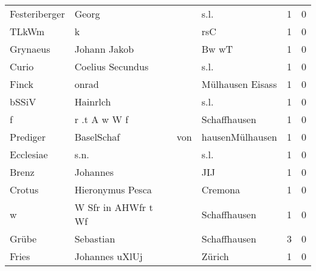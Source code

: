 \begin{center}
\begin{tiny}
\begin{longtabu}{llllrr}
            Festeriberger &                              Georg &             &                                        s.l. &          1 &         0 \\
                    TLkWm &                                  k &             &                                         rsC &          1 &         0 \\
                 Grynaeus &                       Johann Jakob &             &                                       Bw wT &          1 &         0 \\
                    Curio &                   Coelius Secundus &             &                                        s.l. &          1 &         0 \\
                    Finck &                              onrad &             &                            Mülhausen Eisass &          1 &         0 \\
                    bSSiV &                           Hainrlch &             &                                        s.l. &          1 &         0 \\
                        f &                       r .t A w W f &             &                                Schaffhausen &          1 &         0 \\
                 Prediger &                         BaselSchaf &         von &                             hausenMülhausen &          1 &         0 \\
                Ecclesiae &                               s.n. &             &                                        s.l. &          1 &         0 \\
                    Brenz &                           Johannes &             &                                         JIJ &          1 &         0 \\
                   Crotus &                   Hieronymus Pesca &             &                                     Cremona &          1 &         0 \\
                        w &                W Sfr in AHWfr t Wf &             &                                Schaffhausen &          1 &         0 \\
                    Grübe &                          Sebastian &             &                                Schaffhausen &          3 &         0 \\
                    Fries &                     Johannes uXlUj &             &                                      Zürich &          1 &         0 \\

\end{longtabu}
\end{tiny}
\end{center}
